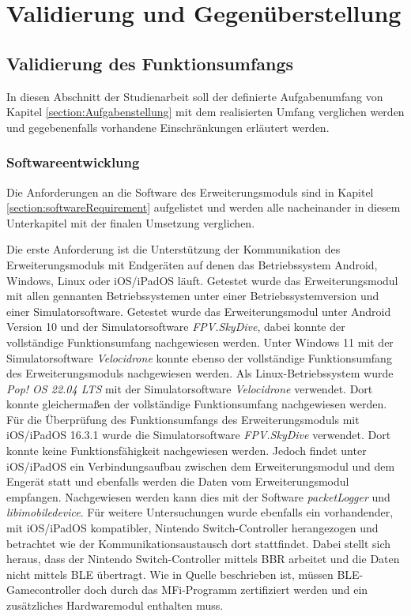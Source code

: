 
\chapter{Validierung und Gegenüberstellung}

\section{Validierung des Funktionsumfangs}

In diesen Abschnitt der Studienarbeit soll der definierte Aufgabenumfang von Kapitel \ref{section:Aufgabenstellung} mit dem realisierten Umfang verglichen werden und gegebenenfalls vorhandene Einschränkungen erläutert werden.

\subsection{Softwareentwicklung}
Die Anforderungen an die Software des Erweiterungsmoduls sind in Kapitel \ref{section:softwareRequirement} aufgelistet und werden alle nacheinander in diesem Unterkapitel mit der finalen Umsetzung verglichen.

Die erste Anforderung ist die Unterstützung der Kommunikation des Erweiterungsmoduls mit Endgeräten auf denen das Betriebssystem Android, Windows, Linux oder iOS/iPadOS läuft. Getestet wurde das Erweiterungsmodul mit allen gennanten Betriebssystemen unter einer Betriebssystemversion und einer Simulatorsoftware. Getestet wurde das Erweiterungsmodul unter Android Version 10 und der Simulatorsoftware \textit{FPV.SkyDive}, dabei konnte der vollständige Funktionsumfang nachgewiesen werden. Unter Windows 11 mit der Simulatorsoftware \textit{Velocidrone} konnte ebenso der vollständige Funktionsumfang des Erweiterungsmoduls nachgewiesen werden. Als Linux-Betriebssystem wurde \textit{Pop! OS 22.04 LTS} mit der Simulatorsoftware \textit{Velocidrone} verwendet. Dort konnte gleichermaßen der vollständige Funktionsumfang nachgewiesen werden. Für die Überprüfung des Funktionsumfangs des Erweiterungsmoduls mit iOS/iPadOS 16.3.1 wurde die Simulatorsoftware \textit{FPV.SkyDive} verwendet. Dort konnte keine Funktionsfähigkeit nachgewiesen werden. Jedoch findet unter iOS/iPadOS ein Verbindungsaufbau zwischen dem Erweiterungsmodul und dem Engerät statt und ebenfalls werden die Daten vom Erweiterungsmodul empfangen. Nachgewiesen werden kann dies mit der Software \textit{packetLogger} und \textit{libimobiledevice}. Für weitere Untersuchungen wurde ebenfalls ein vorhandender, mit iOS/iPadOS kompatibler, Nintendo Switch-Controller herangezogen und betrachtet wie der Kommunikationsaustausch dort stattfindet. Dabei stellt sich heraus, dass der Nintendo Switch-Controller mittels \ac{BBR} arbeitet und die Daten nicht mittels \ac{BLE} übertragt. Wie in Quelle \cite{lemmingDevESP32Comment} beschrieben ist, müssen \ac{BLE}-Gamecontroller doch durch das \ac{MFi}-Programm zertifiziert werden und ein zusätzliches Hardwaremodul enthalten muss.

